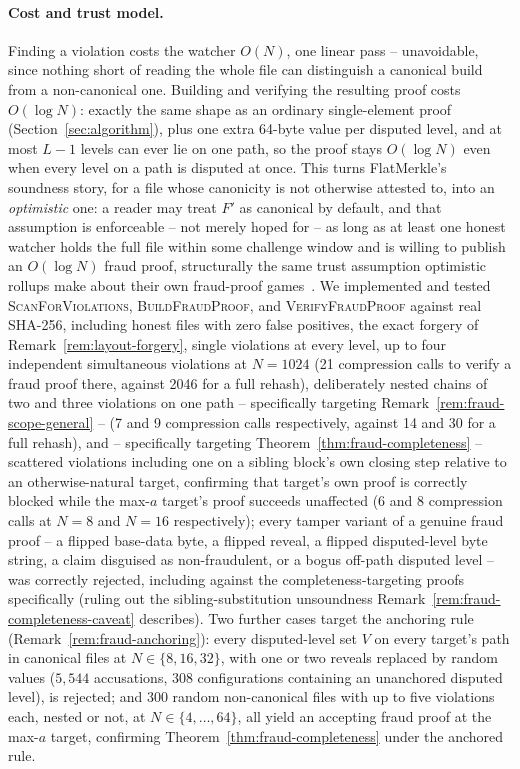 \paragraph{Cost and trust model.} Finding a violation costs the watcher
$O(N)$, one linear pass -- unavoidable, since nothing short of reading the
whole file can distinguish a canonical build from a non-canonical one.
Building and verifying the resulting proof costs $O(\log N)$: exactly the
same shape as an ordinary single-element proof (Section~\ref{sec:algorithm}),
plus one extra 64-byte value per disputed level, and at most $L-1$ levels
can ever lie on one path, so the proof stays $O(\log N)$ even when every
level on a path is disputed at once. This turns FlatMerkle's soundness
story, for a file whose canonicity is not otherwise attested to, into an
\emph{optimistic} one: a reader may treat $F'$ as canonical by default, and
that assumption is enforceable -- not merely hoped for -- as long as at
least one honest watcher holds the full file within some challenge window
and is willing to publish an $O(\log N)$ fraud proof, structurally the same
trust assumption optimistic rollups make about their own fraud-proof
games~\citep{kalodner2018arbitrum}. We implemented and tested
\textsc{ScanForViolations}, \textsc{BuildFraudProof}, and
\textsc{VerifyFraudProof} against real SHA-256, including honest files with
zero false positives, the exact forgery of Remark~\ref{rem:layout-forgery},
single violations at every level, up to four independent simultaneous
violations at $N=1024$ (21 compression calls to verify a fraud proof there,
against 2046 for a full rehash), deliberately nested chains of two and
three violations on one path -- specifically targeting
Remark~\ref{rem:fraud-scope-general} -- (7 and 9 compression calls
respectively, against 14 and 30 for a full rehash), and -- specifically
targeting Theorem~\ref{thm:fraud-completeness} -- scattered violations
including one on a sibling block's own closing step relative to an
otherwise-natural target, confirming that target's own proof is correctly
blocked while the max-$a$ target's proof succeeds unaffected (6 and 8
compression calls at $N=8$ and $N=16$ respectively); every tamper variant
of a genuine fraud proof -- a flipped base-data byte, a flipped reveal, a
flipped disputed-level byte string, a claim disguised as non-fraudulent,
or a bogus off-path disputed level -- was correctly rejected, including
against the completeness-targeting proofs specifically (ruling out the
sibling-substitution unsoundness Remark~\ref{rem:fraud-completeness-caveat}
describes). Two further cases target the anchoring rule
(Remark~\ref{rem:fraud-anchoring}): every disputed-level set $V$ on every
target's path in canonical files at $N \in \{8,16,32\}$, with one or two
reveals replaced by random values ($5{,}544$ accusations, $308$
configurations containing an unanchored disputed level), is rejected; and
$300$ random non-canonical files with up to five violations each, nested
or not, at $N \in \{4,\dots,64\}$, all yield an accepting fraud proof at
the max-$a$ target, confirming Theorem~\ref{thm:fraud-completeness} under
the anchored rule.

